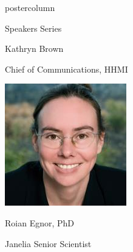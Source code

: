 \documentclass{beamer}
\begin{document}
\begin{frame}
\begin{columns}
\begin{column}{.33\textwidth}
\begin{beamercolorbox}[center,wd=\textwidth]{postercolumn}
\begin{minipage}[T]{.95\textwidth}
{\begin{myblock}{Speakers Series}
\begin{addmargin}[1em]{1em}
\begin{minipage}{0.4\linewidth}
                    \centerline{Kathryn Brown}\newline
                    \centerline{Chief of Communications, HHMI}
                \end{minipage}
            \end{addmargin}
            \vspace{1cm}
            \begin{addmargin}[1em]{1em}
                \centering
                \begin{minipage}{0.4\linewidth}
                    \includegraphics[width=\linewidth]{img/roian.jpg}
                    \centerline{Roian Egnor, PhD}\newline
                    \centerline{Janelia Senior Scientist}
                \end{minipage}
                \hspace{0.75cm}
                \begin{minipage}{0.4\linewidth}

\end{minipage}
\end{addmargin}
\end{myblock}}
\end{minipage}
\end{beamercolorbox}
\end{column}
\end{columns}
\end{frame}
\end{document}
